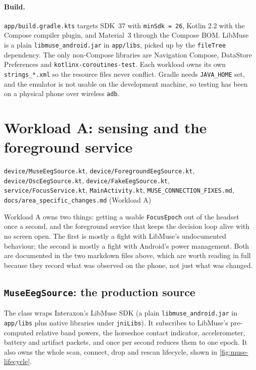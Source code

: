 \documentclass[10pt,a4paper]{article}
\newcommand{\file}[1]{\texttt{\small #1}}          %
\newcommand{\code}[1]{\texttt{#1}}                  %
\begin{document}
\paragraph{Build.} \file{app/build.gradle.kts} targets SDK~37 with \code{minSdk = 26}, Kotlin
2.2 with the Compose compiler plugin, and Material~3 through the Compose BOM. LibMuse is a plain
\code{libmuse\_android.jar} in \file{app/libs}, picked up by the \code{fileTree} dependency. The
only non-Compose libraries are Navigation Compose, DataStore Preferences and
\code{kotlinx-coroutines-test}. Each workload owns its own \file{strings\_*.xml} so the resource
files never conflict. Gradle needs \code{JAVA\_HOME} set, and the emulator is not usable on the
development machine, so testing has been on a physical phone over wireless \code{adb}.
\section{Workload A: sensing and the foreground service}\label{sec:a}

\begin{files}
\file{device/MuseEegSource.kt}, \file{device/ForegroundEegSource.kt}, \file{device/OscEegSource.kt},
\file{device/FakeEegSource.kt}, \file{service/FocusService.kt}, \file{MainActivity.kt},
\file{MUSE\_CONNECTION\_FIXES.md}, \file{docs/area\_specific\_changes.md} (Workload A)
\end{files}

Workload A owns two things: getting a usable \code{FocusEpoch} out of the headset once a second,
and the foreground service that keeps the decision loop alive with no screen open. The first is
mostly a fight with LibMuse's undocumented behaviour; the second is mostly a fight with Android's
power management. Both are documented in the two markdown files above, which are worth reading
in full because they record what was observed on the phone, not just what was changed.

\subsection{\code{MuseEegSource}: the production source}

The class wraps Interaxon's LibMuse SDK (a plain \code{libmuse\_android.jar} in \file{app/libs}
plus native libraries under \file{jniLibs}). It subscribes to LibMuse's pre-computed relative
band powers, the horseshoe contact indicator, accelerometer, battery and artifact packets, and
once per second reduces them to one epoch. It also owns the whole scan, connect, drop and rescan
lifecycle, shown in \cref{fig:muse-lifecycle}.
\end{document}
